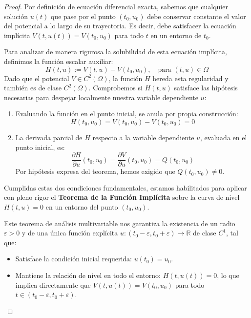 \begin{proof}
    Por definición de ecuación diferencial exacta, sabemos que cualquier solución $u(t)$ que pase por el punto $(t_0, u_0)$ debe conservar constante el valor del potencial a lo largo de su trayectoria. Es decir, debe satisfacer la ecuación implícita $V(t, u(t)) = V(t_0, u_0)$ para todo $t$ en un entorno de $t_0$. 
    
    Para analizar de manera rigurosa la solubilidad de esta ecuación implícita, definimos la función escalar auxiliar:
    \[
        H(t,u) := V(t,u) - V(t_0, u_0), \quad \text{para } (t,u) \in \Omega
    \]
    Dado que el potencial $V \in C^2(\Omega)$, la función $H$ hereda esta regularidad y también es de clase $C^2(\Omega)$. Comprobemos si $H(t,u)$ satisface las hipótesis necesarias para despejar localmente nuestra variable dependiente $u$:
    \begin{enumerate}
        \item Evaluando la función en el punto inicial, se anula por propia construcción:
        \[
            H(t_0, u_0) = V(t_0, u_0) - V(t_0, u_0) = 0
        \]
        \item La derivada parcial de $H$ respecto a la variable dependiente $u$, evaluada en el punto inicial, es:
        \[
            \frac{\partial H}{\partial u} (t_0, u_0) = \frac{\partial V}{\partial u} (t_0, u_0) = Q(t_0, u_0)
        \]
        Por hipótesis expresa del teorema, hemos exigido que $Q(t_0, u_0) \neq 0$.
    \end{enumerate}
    
    Cumplidas estas dos condiciones fundamentales, estamos habilitados para aplicar con pleno rigor el \textbf{Teorema de la Función Implícita} sobre la curva de nivel $H(t,u)=0$ en un entorno del punto $(t_0, u_0)$. 
    
    Este teorema de análisis multivariable nos garantiza la existencia de un radio $\varepsilon > 0$ y de una única función explícita $u : (t_0 - \varepsilon, t_0 + \varepsilon) \to \mathbb{R}$ de clase $C^1$, tal que:
    \begin{itemize}
        \item Satisface la condición inicial requerida: $u(t_0) = u_0$.
        \item Mantiene la relación de nivel en todo el entorno: $H(t, u(t)) = 0$, lo que implica directamente que $V(t, u(t)) = V(t_0, u_0)$ para todo $t \in (t_0 - \varepsilon, t_0 + \varepsilon)$.
    \end{itemize}


\end{proof}

